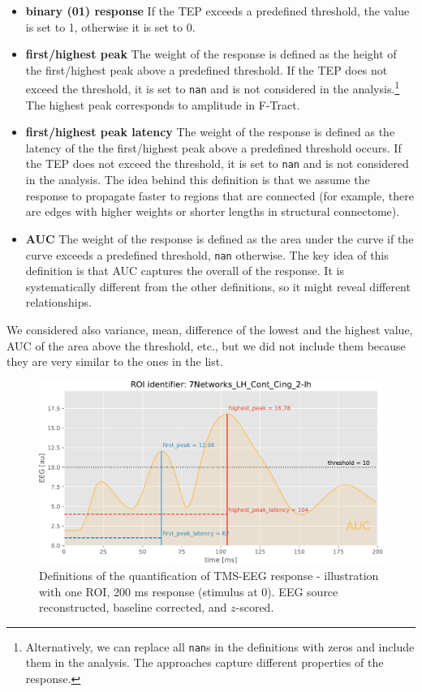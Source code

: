 \begin{itemize}
    \item \textbf{binary (01) response} If the TEP exceeds a predefined threshold, the value is set to 1, otherwise it is set to 0.
    \item \textbf{first/highest peak} The weight of the response is defined as the height of the first/highest peak above a predefined threshold. If the TEP does not exceed the threshold, it is set to \texttt{nan} and is not considered in the analysis.\footnote{Alternatively, we can replace all \texttt{nan}s in the definitions with zeros and include them in the analysis. The approaches capture different properties of the response.} The highest peak corresponds to amplitude in F-Tract. 
    \item \textbf{first/highest peak latency} The weight of the response is defined as the latency of the the first/highest peak above a predefined threshold occurs. If the TEP does not exceed the threshold, it is set to \texttt{nan} and is not considered in the analysis. The idea behind this definition is that we assume the response to propagate faster to regions that are  connected (for example, there are edges with higher weights or shorter lengths in structural connectome).
    \item \textbf{AUC} The weight of the response is defined as the area under the curve if the curve exceeds a predefined threshold, \texttt{nan} otherwise. The key idea of this definition is that AUC captures the overall  of the response. It is systematically different from the other definitions, so it might reveal different relationships.
\end{itemize}

We considered also variance, mean, difference of the lowest and the highest value, AUC of the area above the threshold, etc., but we did not include them because they are very similar to the ones in the list.

\begin{figure}
    \centering
    \includegraphics[width=\textwidth]{images/nootebook_generated/tmseeg_results/simulated/200/not_over_threshold_nan/7Networks_LH_Cont_Cing_2-lh_response_def.pdf}
    \caption[TMS-EEG response definitions -- illustration]{Definitions of the quantification of TMS-EEG response - illustration with one ROI, 200 ms response (stimulus at 0). EEG source reconstructed, baseline corrected, and $z$-scored.}
    \label{fig:tms-respondse-definition}
\end{figure}

